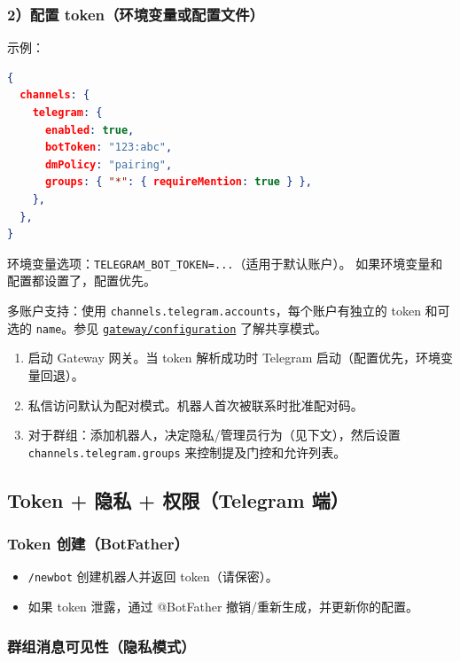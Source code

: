 \subsubsection{2）配置 token（环境变量或配置文件）}


示例：

\begin{lstlisting}[language=json]
{
  channels: {
    telegram: {
      enabled: true,
      botToken: "123:abc",
      dmPolicy: "pairing",
      groups: { "*": { requireMention: true } },
    },
  },
}
\end{lstlisting}


环境变量选项：\texttt{TELEGRAM\_BOT\_TOKEN=...}（适用于默认账户）。
如果环境变量和配置都设置了，配置优先。

多账户支持：使用 \texttt{channels.telegram.accounts}，每个账户有独立的 token 和可选的 \texttt{name}。参见 \href{/gateway/configuration\#telegramaccounts--discordaccounts--slackaccounts--signalaccounts--imessageaccounts}{\texttt{gateway/configuration}} 了解共享模式。

\begin{enumerate}
  \item 启动 Gateway 网关。当 token 解析成功时 Telegram 启动（配置优先，环境变量回退）。
  \item 私信访问默认为配对模式。机器人首次被联系时批准配对码。
  \item 对于群组：添加机器人，决定隐私/管理员行为（见下文），然后设置 \texttt{channels.telegram.groups} 来控制提及门控和允许列表。
\end{enumerate}


\subsection{Token + 隐私 + 权限（Telegram 端）}


\subsubsection{Token 创建（BotFather）}


\begin{itemize}
  \item \texttt{/newbot} 创建机器人并返回 token（请保密）。
  \item 如果 token 泄露，通过 @BotFather 撤销/重新生成，并更新你的配置。
\end{itemize}


\subsubsection{群组消息可见性（隐私模式）}


